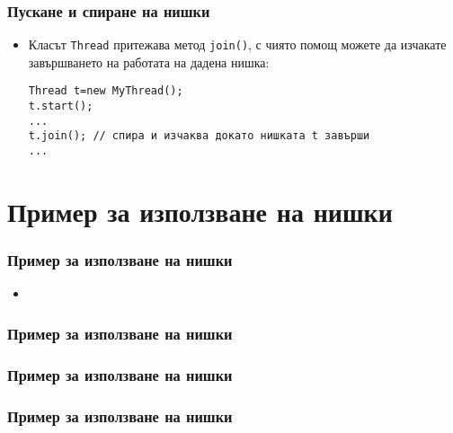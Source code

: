 \documentclass[ignorenonframetext, hyperref=unicode,compress]{beamer}
\begin{document}
\begin{frame}[containsverbatim]
\frametitle{Пускане и спиране на нишки}
\begin{itemize}
\item Класът \lstinline{Thread} притежава метод \lstinline{join()}, с чиято
помощ можете да изчакате завършването на работата на дадена нишка:
\begin{lstlisting}
Thread t=new MyThread();
t.start();
...
t.join(); // спира и изчаква докато нишката t завърши
...
\end{lstlisting}
\end{itemize}
\end{frame}

\section{Пример за използване на нишки}
\begin{frame}[containsverbatim]
\frametitle{Пример за използване на нишки}
\begin{itemize}
\item 
\end{itemize}
\end{frame}

\begin{frame}[containsverbatim,shrink=5]
\frametitle{Пример за използване на нишки}

\end{frame}

\begin{frame}[containsverbatim,shrink=5]
\frametitle{Пример за използване на нишки}

\end{frame}


\begin{frame}[containsverbatim,shrink=5]
\frametitle{Пример за използване на нишки}

\end{frame}
\end{document}
